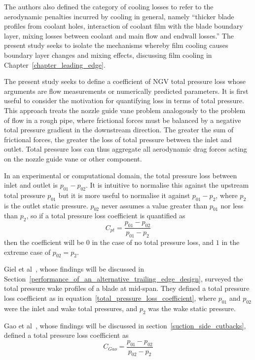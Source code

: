 \documentclass[a4paper, 11pt, oneside]{report}
\begin{document}
The authors also defined the category of cooling losses to refer to the aerodynamic penalties incurred by cooling in general, namely ``thicker blade profiles from coolant holes, interaction of coolant film with the blade boundary layer, mixing losses between coolant and main flow and endwall losses.'' The present study seeks to isolate the mechanisms whereby film cooling causes boundary layer changes and mixing effects, discussing film cooling in Chapter~\ref{chapter_leading_edge}.

The present study seeks to define a coefficient of NGV total pressure loss whose arguments are flow measurements or numerically predicted parameters. It is first useful to consider the motivation for quantifying loss in terms of total pressure. This approach treats the nozzle guide vane problem analogously to the problem of flow in a rough pipe, where frictional forces must be balanced by a negative total pressure gradient in the downstream direction. The greater the sum of frictional forces, the greater the loss of total pressure between the inlet and outlet. Total pressure loss can thus aggregate all aerodynamic drag forces acting on the nozzle guide vane or other component.

In an experimental or computational domain, the total pressure loss between inlet and outlet is $p_{01} - p_{02}$. It is intuitive to normalise this against the upstream total pressure $p_{01}$ but it is more useful to normalise it against $p_{01} - p_2$, where $p_2$ is the outlet static pressure. $p_{02}$ never assumes a value greater than $p_{01}$ nor less than $p_2$, so if a total pressure loss coefficient is quantified as
\begin{equation}\label{total_pressure_loss_coefficient}
C_{pt} = \frac{
p_{01} - p_{02}
}{
p_{01} - p_2
}
\end{equation}
then the coefficient will be $0$ in the case of no total pressure loss, and $1$ in the extreme case of $p_{02} = p_2$.

Giel et al~\cite{giel_te_thickness}, whose findings will be discussed in Section~\ref{performance_of_an_alternative_trailing_edge_design}, surveyed the total pressure wake profiles of a blade at mid-span. They defined a total pressure loss coefficient as in equation~\ref{total_pressure_loss_coefficient}, where $p_{01}$ and $p_{02}$ were the inlet and wake total pressures, and $p_2$ was the wake static pressure. 

Gao et al~\cite{gao_te}, whose findings will be discussed in section~\ref{suction_side_cutbacks}, defined a total pressure loss coefficient as
\begin{equation}
C_{Gao} = \frac{
p_{01} - p_{02}
}{
p_{02} - p_2
}
\end{equation}
\end{document}
